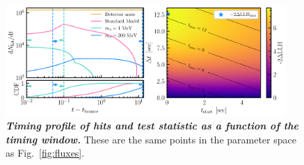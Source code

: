
\begin{figure}
    \centering
    \includegraphics[width=0.95\textwidth]{figures/hits_and_likelihood.pdf}
    \caption{\textbf{\textit{Timing profile of hits and test statistic as a function of the timing window.}}
    These are the same points in the parameter space as Fig.~\ref{fig:fluxes}.
    }
    \label{fig:hits_and_likelihood}
\end{figure}
